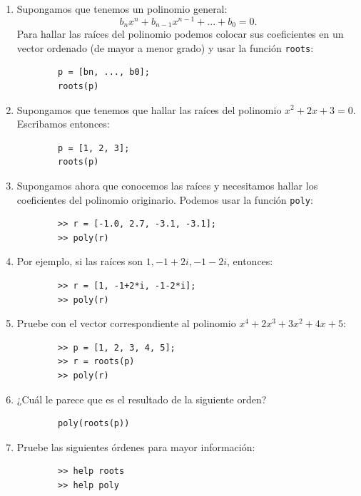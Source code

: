\documentclass[11pt,a4paper,openany]{book}
\begin{document}
\begin{enumerate}
	\item Supongamos que tenemos un polinomio general:
	\begin{equation}
		b_{n}x^{n}+b_{n-1}x^{n-1}+...+b_{0}=0.
	\end{equation}
	Para hallar las raíces del polinomio podemos colocar sus coeficientes en un vector ordenado (de mayor a menor grado) y usar la función \texttt{roots}:
	\begin{verbatim}
		p = [bn, ..., b0];
		roots(p)
	\end{verbatim}
	
	\item Supongamos que tenemos que hallar las raíces del polinomio $x^{2}+2x+3=0$. Escribamos entonces:
	\begin{verbatim}
		p = [1, 2, 3];
		roots(p)
	\end{verbatim}
	
	\item Supongamos ahora que conocemos las raíces y necesitamos hallar los coeficientes del polinomio originario. Podemos usar la función \texttt{poly}:
	\begin{verbatim}
		>> r = [-1.0, 2.7, -3.1, -3.1];
		>> poly(r)
	\end{verbatim}
	
	\item Por ejemplo, si las raíces son $1, -1+2i, -1-2i$, entonces:
	\begin{verbatim}
		>> r = [1, -1+2*i, -1-2*i];
		>> poly(r)
	\end{verbatim}
	
	\item Pruebe con el vector correspondiente al polinomio $x^4+2x^3+3x^2+4x+5$:
	\begin{verbatim}
		>> p = [1, 2, 3, 4, 5]; 
		>> r = roots(p)
		>> poly(r)
	\end{verbatim}
	
	\item ¿Cuál le parece que es el resultado de la siguiente orden?
	\begin{verbatim}
		poly(roots(p))
	\end{verbatim}
	
	\item Pruebe las siguientes órdenes para mayor información:
	\begin{verbatim}
		>> help roots
		>> help poly
	\end{verbatim}
\end{enumerate}
\end{document}
